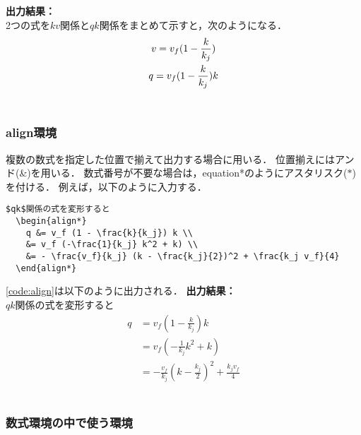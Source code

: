 \noindent\textbf{出力結果：}\hrulefill\\
  2つの式を$kv$関係と$qk$関係をまとめて示すと，次のようになる．
  \begin{gather}
    v = v_f (1 - \frac{k}{k_j}) \notag\\
    q = v_f (1 - \frac{k}{k_j}) k \notag
  \end{gather}
\\\noindent\hrulefill 

\subsubsection{align環境}

複数の数式を指定した位置で揃えて出力する場合に用いる．
位置揃えにはアンド(\&)を用いる．
数式番号が不要な場合は，equation*のようにアスタリスク($\ast$)を付ける．
例えば，以下のように入力する．
\begin{lstlisting}[caption=align環境,label=code:align]
  $qk$関係の式を変形すると
  \begin{align*}
    q &= v_f (1 - \frac{k}{k_j}) k \\
    &= v_f (-\frac{1}{k_j} k^2 + k) \\
    &= - \frac{v_f}{k_j} (k - \frac{k_j}{2})^2 + \frac{k_j v_f}{4}
  \end{align*}
\end{lstlisting}
\code\ref{code:align}は以下のように出力される．
\clearpage
\noindent\textbf{出力結果：}\hrulefill\\
  $qk$関係の式を変形すると
  \begin{align*}
    q &= v_f (1 - \frac{k}{k_j}) k \\
    &= v_f (-\frac{1}{k_j} k^2 + k) \\
    &= - \frac{v_f}{k_j} (k - \frac{k_j}{2})^2 + \frac{k_j v_f}{4}
  \end{align*}
\\\noindent\hrulefill 

\subsubsection{数式環境の中で使う環境}


